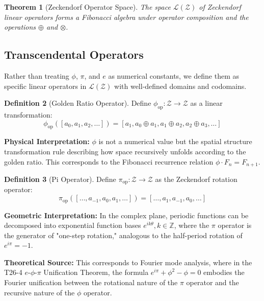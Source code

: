 \documentclass[12pt]{article}
\theoremstyle{plain}
\newtheorem{theorem}{Theorem}[section]
\theoremstyle{definition}
\newtheorem{definition}[theorem]{Definition}
\begin{document}
\begin{theorem}[Zeckendorf Operator Space]
The space $\mathcal{L}(\mathcal{Z})$ of Zeckendorf linear operators forms a Fibonacci algebra under operator composition and the operations $\oplus$ and $\otimes$.
\end{theorem}

\subsection{Transcendental Operators}

Rather than treating $\phi$, $\pi$, and $e$ as numerical constants, we define them as specific linear operators in $\mathcal{L}(\mathcal{Z})$ with well-defined domains and codomains.

\begin{definition}[Golden Ratio Operator]
Define $\phi_{\text{op}}: \mathcal{Z} \to \mathcal{Z}$ as a linear transformation:
$$\phi_{\text{op}}([a_0, a_1, a_2, \ldots]) = [a_1, a_0 \oplus a_1, a_1 \oplus a_2, a_2 \oplus a_3, \ldots]$$

\textbf{Physical Interpretation:} $\phi$ is not a numerical value but the spatial structure transformation rule describing how space recursively unfolds according to the golden ratio. This corresponds to the Fibonacci recurrence relation $\phi \cdot F_n = F_{n+1}$.
\end{definition}

\begin{definition}[Pi Operator]
Define $\pi_{\text{op}}: \mathcal{Z} \to \mathcal{Z}$ as the Zeckendorf rotation operator:
$$\pi_{\text{op}}([\ldots, a_{-1}, a_0, a_1, \ldots]) = [\ldots, a_1, a_{-1}, a_0, \ldots]$$

\textbf{Geometric Interpretation:} In the complex plane, periodic functions can be decomposed into exponential function bases $e^{ik\theta}, k \in \mathbb{Z}$, where the $\pi$ operator is the generator of "one-step rotation," analogous to the half-period rotation of $e^{i\pi}=-1$.

\textbf{Theoretical Source:} This corresponds to Fourier mode analysis, where in the T26-4 $e$-$\phi$-$\pi$ Unification Theorem, the formula $e^{i\pi} + \phi^2 - \phi = 0$ embodies the Fourier unification between the rotational nature of the $\pi$ operator and the recursive nature of the $\phi$ operator.
\end{definition}
\end{document}
